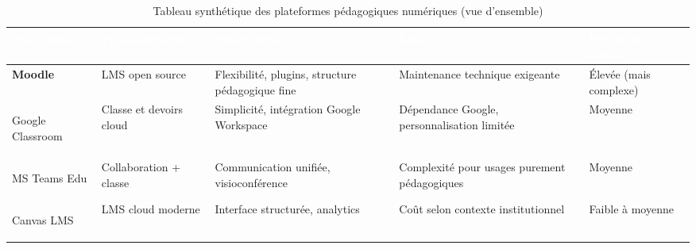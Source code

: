 \documentclass[12pt,a4paper,oneside]{report}
\begin{document}
\renewcommand{\arraystretch}{1.8}
{\setlength{\tabcolsep}{7pt}
\begin{table}[H]
\centering
\caption{Tableau synth\'etique des plateformes p\'edagogiques num\'eriques (vue d'ensemble)}
\label{tab:compar_synth}
\begin{tabular}{|>{\bfseries}p{2.3cm}|p{2.5cm}|p{3.2cm}|p{3.0cm}|p{2.2cm}|}

\hline
\rowcolor{ustoblue}
\textcolor{white}{\textbf{Plateforme}} &
\textcolor{white}{\textbf{Positionnement}} &
\textcolor{white}{\textbf{Points forts}} &
\textcolor{white}{\textbf{Limites}} &
\textcolor{white}{\textbf{Pertinence locale}} \\
\hline

\rowcolor{ustolightblue!40}
Moodle &
LMS open source &
Flexibilit\'e, plugins, structure p\'edagogique fine &
Maintenance technique exigeante &
\'Elev\'ee (mais complexe) \\
\hline

\rowcolor{rowgray}
Google Classroom &
Classe et devoirs cloud &
Simplicit\'e, int\'egration Google Workspace &
D\'ependance Google, personnalisation limit\'ee &
Moyenne \\
\hline

\rowcolor{ustolightblue!40}
MS Teams Edu &
Collaboration + classe &
Communication unifi\'ee, visioconf\'erence &
Complexit\'e pour usages purement p\'edagogiques &
Moyenne \\
\hline

\rowcolor{rowgray}
Canvas LMS &
LMS cloud moderne &
Interface structur\'ee, analytics &
Co\^ut selon contexte institutionnel &
Faible \`a moyenne \\
\hline

\end{tabular}
\end{table}}


\end{document}
